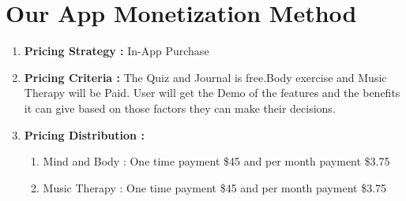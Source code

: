 \section{Our App Monetization Method}
\begin{enumerate}
    \item \textbf{Pricing Strategy :} In-App Purchase
    \item \textbf{Pricing Criteria :} The Quiz and Journal is free.Body exercise  and Music Therapy will be Paid. User will get the Demo of the features and the benefits it can give based on those factors they can make their decisions.
    \item \textbf{Pricing Distribution :} \begin{enumerate}
        \item Mind and Body : One time payment \$45 and per month payment \$3.75
         \item Music Therapy : One time payment \$45 and per month payment \$3.75
    \end{enumerate} 
    
\end{enumerate}